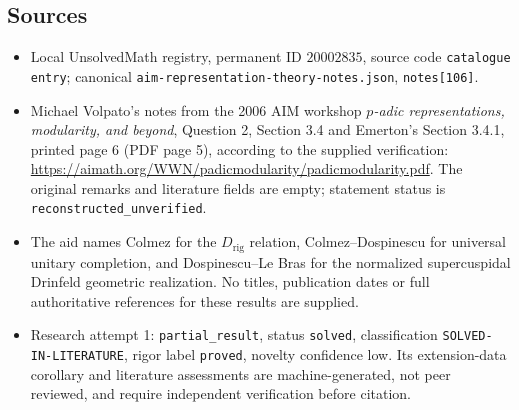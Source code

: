 \documentclass[11pt]{article}
\begin{document}
\subsection{Sources}
\begin{itemize}
\item Local UnsolvedMath registry, permanent ID $20002835$, source code \texttt{catalogue entry}; canonical \texttt{aim-representation-theory-notes.json}, \texttt{notes[106]}.
\item Michael Volpato's notes from the 2006 AIM workshop \emph{$p$-adic representations, modularity, and beyond}, Question 2, Section 3.4 and Emerton's Section 3.4.1, printed page 6 (PDF page 5), according to the supplied verification: \url{https://aimath.org/WWN/padicmodularity/padicmodularity.pdf}. The original remarks and literature fields are empty; statement status is \texttt{reconstructed\_unverified}.
\item The aid names Colmez for the $D_{\mathrm{rig}}$ relation, Colmez--Dospinescu for universal unitary completion, and Dospinescu--Le Bras for the normalized supercuspidal Drinfeld geometric realization. No titles, publication dates or full authoritative references for these results are supplied.
\item Research attempt 1: \texttt{partial\_result}, status \texttt{solved}, classification \texttt{SOLVED-IN-LITERATURE}, rigor label \texttt{proved}, novelty confidence low. Its extension-data corollary and literature assessments are machine-generated, not peer reviewed, and require independent verification before citation.
\end{itemize}
\end{document}
